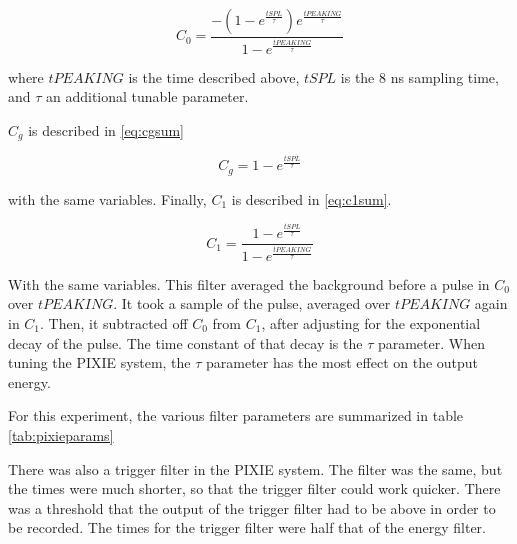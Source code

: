 \begin{equation}
	C_{0} = \frac{-(1 - e^{\frac{tSPL}{\tau}})e^{\frac{tPEAKING}{\tau}}}{1 - e^{\frac{tPEAKING}{\tau}}}
	\label{eq:c0sum}
\end{equation}

where $tPEAKING$ is the time described above, $tSPL$ is the 8 ns sampling time, and $\tau$ an additional tunable parameter.

$C_{g}$ is described in \ref{eq:cgsum}

\begin{equation}
	C_{g} = 1 - e^{\frac{tSPL}{\tau}}
	\label{eq:cgsum}
\end{equation}

with the same variables.
Finally, $C_{1}$ is described in \ref{eq:c1sum}.

\begin{equation}
	C_{1} = \frac{1 - e^{\frac{tSPL}{\tau}}}{1 - e^{\frac{tPEAKING}{\tau}}}
	\label{eq:c1sum}
\end{equation}

With the same variables.
This filter averaged the background before a pulse in $C_{0}$ over $tPEAKING$.
It took a sample of the pulse, averaged over $tPEAKING$ again in $C_{1}$.
Then, it subtracted off $C_{0}$ from $C_{1}$, after adjusting for the exponential decay of the pulse.
The time constant of that decay is the $\tau$ parameter.
When tuning the PIXIE system, the $\tau$ parameter has the most effect on the output energy.

For this experiment, the various filter parameters are summarized in table \ref{tab:pixieparams}  
%
\begin{table}[!hbt]
	\centering
	\caption{Energy Filter Parameters}
			\label{tab:pixieparams}
\end{table}
%

There was also a trigger filter in the PIXIE system.
The filter was the same, but the times were much shorter, so that the trigger filter could work quicker. 
There was a threshold that the output of the trigger filter had to be above in order to be recorded.
The times for the trigger filter were half that of the energy filter.


